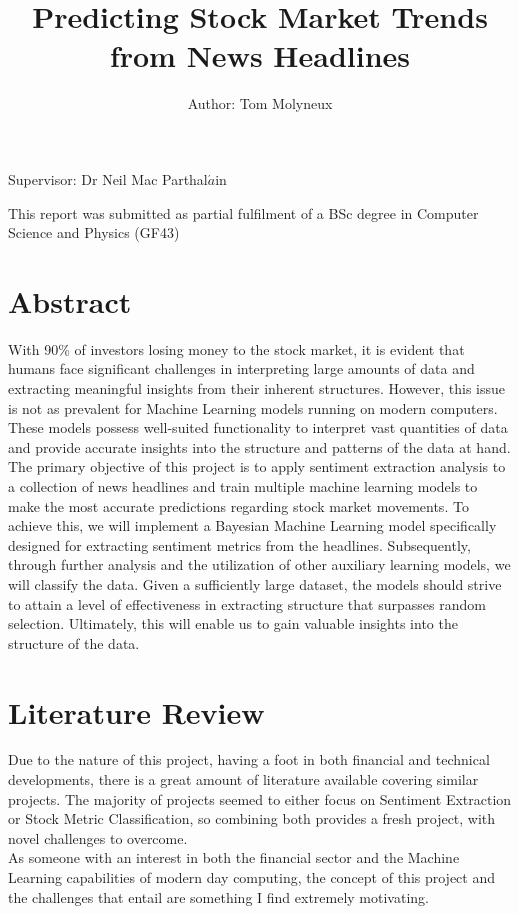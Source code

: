 \documentclass[11pt, a4paper]{article}
\title{Predicting Stock Market Trends from News Headlines}
\author{Author: Tom Molyneux}
\begin{document}
\maketitle
\centerline{Supervisor: Dr Neil Mac Parthal$\acute{a}$in}
\begin{center}
This report was submitted as partial fulfilment of a BSc degree in Computer Science and Physics (GF43)
\end{center}
\pagebreak
\tableofcontents
\newpage

\section{Abstract}
With 90\% of investors losing money to the stock market, it is evident that humans face significant challenges in interpreting large amounts of data and extracting meaningful insights from their inherent structures. However, this issue is not as prevalent for Machine Learning models running on modern computers. These models possess well-suited functionality to interpret vast quantities of data and provide accurate insights into the structure and patterns of the data at hand.
\\
The primary objective of this project is to apply sentiment extraction analysis to a collection of news headlines and train multiple machine learning models to make the most accurate predictions regarding stock market movements. To achieve this, we will implement a Bayesian Machine Learning model specifically designed for extracting sentiment metrics from the headlines. Subsequently, through further analysis and the utilization of other auxiliary learning models, we will classify the data. Given a sufficiently large dataset, the models should strive to attain a level of effectiveness in extracting structure that surpasses random selection. Ultimately, this will enable us to gain valuable insights into the structure of the data.
\\
\newpage
\section{Literature Review}
Due to the nature of this project, having a foot in both financial and technical developments, there is a great amount of literature available covering similar projects. The majority of projects seemed to either focus on Sentiment Extraction or Stock Metric Classification, so combining both provides a fresh project, with novel challenges to overcome. 
\\
As someone with an interest in both the financial sector and the Machine Learning capabilities of modern day computing, the concept of this project and the challenges that entail are something I find extremely motivating.
\end{document}
